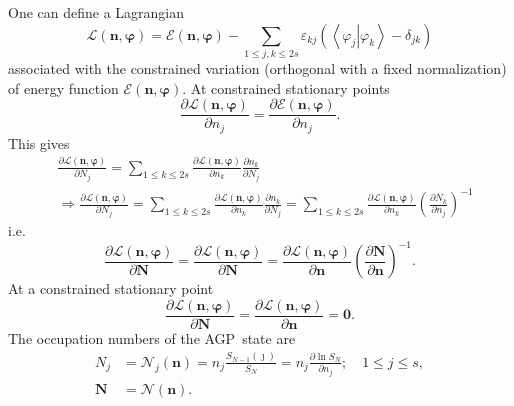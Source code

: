 \documentclass[aps,preprint]{revtex4}%
\begin{document}
One can define a Lagrangian
\begin{equation}
\mathcal{L}\left(  \mathbf{n,\varphi}\right)  =\mathcal{E}\left(
\mathbf{n,\varphi}\right)  -\sum_{1\leq j,k\leq2s}\varepsilon_{kj}\left(
\left\langle \left.  \varphi_{j}\right\vert \varphi_{k}\right\rangle
-\delta_{jk}\right)
\end{equation}
associated with the constrained variation (orthogonal with a fixed
normalization) of energy function $\mathcal{E}\left(  \mathbf{n,\varphi
}\right)  .$ At constrained stationary points
\begin{equation}
\frac{\partial\mathcal{L}\left(  \mathbf{n,\varphi}\right)  }{\partial n_{j}%
}=\frac{\partial\mathcal{E}\left(  \mathbf{n,\varphi}\right)  }{\partial
n_{j}}.
\end{equation}
This gives
\begin{align}
&  \frac{\partial\mathcal{L}\left(  \mathbf{n,\varphi}\right)  }{\partial
N_{j}}=\sum_{1\leq k\leq2s}\frac{\partial\mathcal{L}\left(  \mathbf{n,\varphi
}\right)  }{\partial n_{k}}\frac{\partial n_{k}}{\partial N_{j}}\\
&  \Rightarrow\frac{\partial\mathcal{L}\left(  \mathbf{n,\varphi}\right)
}{\partial N_{j}}=\sum_{1\leq k\leq2s}\frac{\partial\mathcal{L}\left(
\mathbf{n,\varphi}\right)  }{\partial n_{k}}\frac{\partial n_{k}}{\partial
N_{j}}=\sum_{1\leq k\leq2s}\frac{\partial\mathcal{L}\left(  \mathbf{n,\varphi
}\right)  }{\partial n_{k}}\left(  \frac{\partial N_{k}}{\partial n_{j}%
}\right)  ^{-1}%
\end{align}
i.e.%
\begin{equation}
\frac{\partial\mathcal{L}\left(  \mathbf{n,\varphi}\right)  }{\partial
\mathbf{N}}=\frac{\partial\mathcal{L}\left(  \mathbf{n,\varphi}\right)
}{\partial\mathbf{N}}=\frac{\partial\mathcal{L}\left(  \mathbf{n,\varphi
}\right)  }{\partial\mathbf{n}}\left(  \frac{\partial\mathbf{N}}%
{\partial\mathbf{n}}\right)  ^{-1}.
\end{equation}
At a constrained stationary point
\begin{equation}
\frac{\partial\mathcal{L}\left(  \mathbf{n,\varphi}\right)  }{\partial
\mathbf{N}}=\frac{\partial\mathcal{L}\left(  \mathbf{n,\varphi}\right)
}{\partial\mathbf{n}}=\mathbf{0.}%
\end{equation}
The occupation numbers of the AGP\ state are
\begin{align}
N_{j}  &  =\mathcal{N}_{j}\left(  \mathbf{n}\right)  =n_{j}\frac
{S_{N-1}\left(  \jmath\right)  }{S_{N}}=n_{j}\frac{\partial\ln S_{N}}{\partial
n_{j}};\quad1\leq j\leq s,\\
\mathbf{N}  &  =\mathcal{N}\left(  \mathbf{n}\right)  .
\end{align}%
\end{document}
